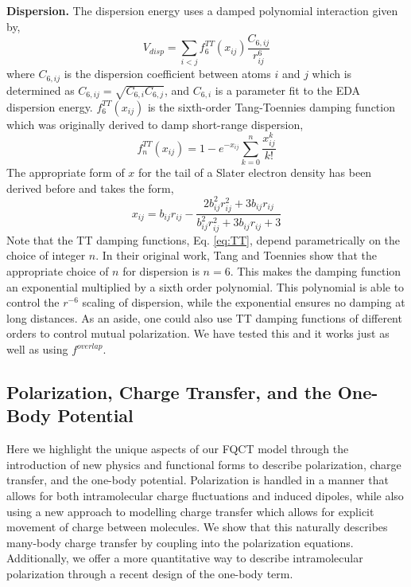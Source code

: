 \documentclass[journal=jctcce,manuscript=article]{achemso}
\begin{document}
\textbf{Dispersion.} The dispersion energy uses a damped polynomial interaction given by,
\begin{equation}
  V_{disp}=\sum_{i<j}f_6^{TT}(x_{ij})\frac{C_{6,ij}}{r_{ij}^6}
  \label{eq:disp}
\end{equation}
\noindent
where $C_{6,ij}$ is the dispersion coefficient between atoms $i$ and $j$ which is determined as $C_{6,ij}=\sqrt{C_{6,i}C_{6,j}}$, and $C_{6,i}$ is a parameter fit to the EDA dispersion energy. $f_6^{TT}(x_{ij})$ is the sixth-order Tang-Toennies damping function\cite{tang1984improved} which was originally derived to damp short-range dispersion,
\begin{equation}
  f_n^{TT}(x_{ij}) = 1-e^{-x_{ij}}\sum_{k=0}^n\frac{x_{ij}^k}{k!}
  \label{eq:TT}
\end{equation}
The appropriate form of $x$ for the tail of a Slater electron density has been derived before\cite{van2016beyond} and takes the form,
\begin{equation}
  x_{ij}=b_{ij}r_{ij}-\frac{2b_{ij}^2r_{ij}^2+3b_{ij}r_{ij}}{b_{ij}^2r_{ij}^2+3b_{ij}r_{ij}+3}
  \label{eq:TT_x}
\end{equation}
Note that the TT damping functions, Eq. \ref{eq:TT}, depend parametrically on the choice of integer $n$. In their original work, Tang and Toennies show that the appropriate choice of $n$ for dispersion is $n=6$. This makes the damping function an exponential multiplied by a sixth order polynomial. This polynomial is able to control the $r^{-6}$ scaling of dispersion, while the exponential ensures no damping at long distances. As an aside, one could also use TT damping functions of different orders to control mutual polarization. We have tested this and it works just as well as using $f^{overlap}$.

\subsection*{Polarization, Charge Transfer, and the One-Body Potential}
Here we highlight the unique aspects of our FQCT model through the introduction of new physics and functional forms to describe polarization, charge transfer, and the one-body potential. Polarization is handled in a manner that allows for both intramolecular charge fluctuations and induced dipoles, while also using a new approach to modelling charge transfer which allows for explicit movement of charge between molecules. We show that this naturally describes many-body charge transfer by coupling into the polarization equations. Additionally, we offer a more quantitative way to describe intramolecular polarization through a recent design of the one-body term.
\end{document}
